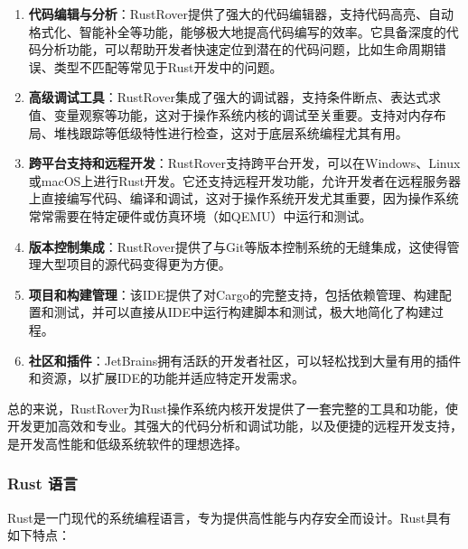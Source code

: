 \begin{enumerate}
    \item \textbf{代码编辑与分析}：RustRover提供了强大的代码编辑器，支持代码高亮、自动格式化、智能补全等功能，能够极大地提高代码编写的效率。它具备深度的代码分析功能，可以帮助开发者快速定位到潜在的代码问题，比如生命周期错误、类型不匹配等常见于Rust开发中的问题。
    \item \textbf{高级调试工具}：RustRover集成了强大的调试器，支持条件断点、表达式求值、变量观察等功能，这对于操作系统内核的调试至关重要。支持对内存布局、堆栈跟踪等低级特性进行检查，这对于底层系统编程尤其有用。
    \item \textbf{跨平台支持和远程开发}：RustRover支持跨平台开发，可以在Windows、Linux或macOS上进行Rust开发。它还支持远程开发功能，允许开发者在远程服务器上直接编写代码、编译和调试，这对于操作系统开发尤其重要，因为操作系统常常需要在特定硬件或仿真环境（如QEMU）中运行和测试。
    \item \textbf{版本控制集成}：RustRover提供了与Git等版本控制系统的无缝集成，这使得管理大型项目的源代码变得更为方便。
    \item \textbf{项目和构建管理}：该IDE提供了对Cargo的完整支持，包括依赖管理、构建配置和测试，并可以直接从IDE中运行构建脚本和测试，极大地简化了构建过程。
    \item \textbf{社区和插件}：JetBrains拥有活跃的开发者社区，可以轻松找到大量有用的插件和资源，以扩展IDE的功能并适应特定开发需求。
\end{enumerate}

总的来说，RustRover为Rust操作系统内核开发提供了一套完整的工具和功能，使开发更加高效和专业。其强大的代码分析和调试功能，以及便捷的远程开发支持，是开发高性能和低级系统软件的理想选择。

\subsubsection{Rust 语言}

Rust是一门现代的系统编程语言，专为提供高性能与内存安全而设计。Rust具有如下特点：

